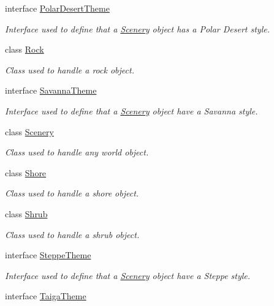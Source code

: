 \begin{DoxyCompactItemize}
interface \hyperlink{interfaceworld_1_1scenery_1_1_polar_desert_theme}{Polar\-Desert\-Theme}
\begin{DoxyCompactList}\small\item\em Interface used to define that a \hyperlink{classworld_1_1scenery_1_1_scenery}{Scenery} object has a Polar Desert style. \end{DoxyCompactList}\item 
class \hyperlink{classworld_1_1scenery_1_1_rock}{Rock}
\begin{DoxyCompactList}\small\item\em Class used to handle a rock object. \end{DoxyCompactList}\item 
interface \hyperlink{interfaceworld_1_1scenery_1_1_savanna_theme}{Savanna\-Theme}
\begin{DoxyCompactList}\small\item\em Interface used to define that a \hyperlink{classworld_1_1scenery_1_1_scenery}{Scenery} object have a Savanna style. \end{DoxyCompactList}\item 
class \hyperlink{classworld_1_1scenery_1_1_scenery}{Scenery}
\begin{DoxyCompactList}\small\item\em Class used to handle any world object. \end{DoxyCompactList}\item 
class \hyperlink{classworld_1_1scenery_1_1_shore}{Shore}
\begin{DoxyCompactList}\small\item\em Class used to handle a shore object. \end{DoxyCompactList}\item 
class \hyperlink{classworld_1_1scenery_1_1_shrub}{Shrub}
\begin{DoxyCompactList}\small\item\em Class used to handle a shrub object. \end{DoxyCompactList}\item 
interface \hyperlink{interfaceworld_1_1scenery_1_1_steppe_theme}{Steppe\-Theme}
\begin{DoxyCompactList}\small\item\em Interface used to define that a \hyperlink{classworld_1_1scenery_1_1_scenery}{Scenery} object have a Steppe style. \end{DoxyCompactList}\item 
interface \hyperlink{interfaceworld_1_1scenery_1_1_taiga_theme}{Taiga\-Theme}

\end{DoxyCompactItemize}
